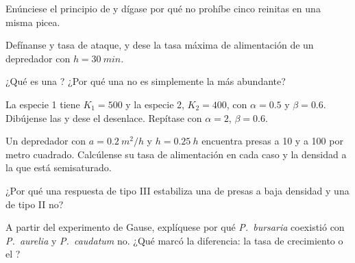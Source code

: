 \begin{exercise}[$\star$]\label{exo:b1:species-interactions:2}
Enúnciese el principio de  y dígase por qué no prohíbe
cinco reinitas en una misma picea.
\end{exercise}

\begin{exercise}[$\star$]\label{exo:b1:species-interactions:3}
Defínanse  y tasa de ataque, y dese la tasa máxima de
alimentación de un depredador con $h = \qty{30}{min}$.
\end{exercise}

\begin{exercise}[$\star$]\label{exo:b1:species-interactions:4}
¿Qué es una ? ¿Por qué una  no es simplemente la
más abundante?
\end{exercise}

\begin{exercise}[$\star\star$]\label{exo:b1:species-interactions:5}
La especie 1 tiene $K_1 = 500$ y la especie 2, $K_2 = 400$, con $\alpha =
0.5$ y $\beta = 0.6$. Dibújense las  y dese el desenlace. Repítase
con $\alpha = 2$, $\beta = 0.6$.
\end{exercise}

\begin{exercise}[$\star\star$]\label{exo:b1:species-interactions:6}
Un depredador con $a = \qty{0.2}{m^2/h}$ y $h = \qty{0.25}{h}$ encuentra
presas a \qty{10}{} y a \qty{100}{} por metro cuadrado. Calcúlense su tasa
de alimentación en cada caso y la densidad a la que está semisaturado.
\end{exercise}

\begin{exercise}[$\star\star$]\label{exo:b1:species-interactions:7}
¿Por qué una respuesta de tipo III estabiliza una  de presas a baja
densidad y una de tipo II no?
\end{exercise}

\begin{exercise}[$\star\star$]\label{exo:b1:species-interactions:8}
A partir del experimento de Gause, explíquese por qué \emph{P.~bursaria}
coexistió con \emph{P.~aurelia} y \emph{P.~caudatum} no. ¿Qué marcó la
diferencia: la tasa de crecimiento o el ?
\end{exercise}

